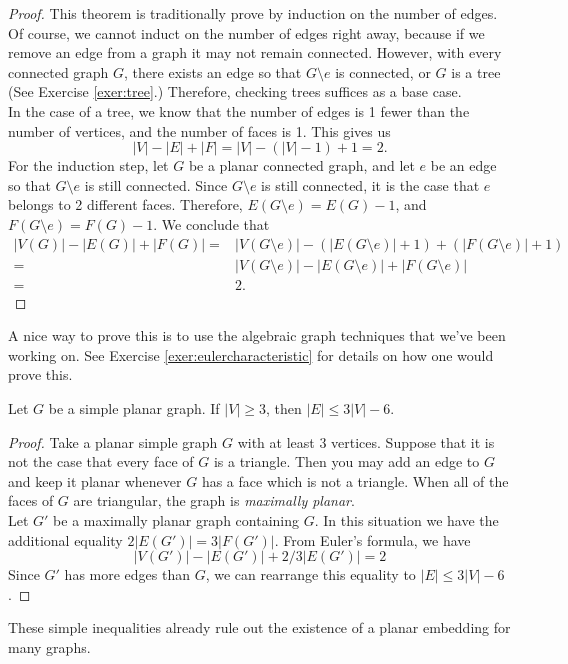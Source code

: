 \begin{proof}
 This theorem is traditionally prove by induction on the number of edges. Of course, we cannot induct on the number of edges right away, because if we remove an edge from a graph it may not remain connected. However, with every connected graph $G$, there exists an edge so that $G\setminus e$ is connected, or $G$ is a tree (See Exercise \ref{exer:tree}.) Therefore, checking trees suffices as a base case.\\
 In the case of a tree, we know that the number of edges is 1 fewer than the number of vertices, and the number of faces is 1. This gives us 
 \[|V|-|E|+|F|=|V|-(|V|-1)+1=2.\]
 For the induction step, let $G$ be a planar connected graph, and let $e$ be an edge so that $G\setminus e$ is still connected. Since $G\setminus e$ is still connected, it is the case that $e$ belongs to 2 different faces. Therefore, $E(G\setminus e)=E(G)-1$, and $F(G\setminus e)=F(G)-1$. We conclude that 
 \begin{align*}
 |V(G)|-|E(G)|+|F(G)|= &|V(G\setminus e)|-(|E(G\setminus e)|+1)+(|F(G\setminus e)|+1)\\
 =&|V(G\setminus e)|-|E(G\setminus e)|+|F(G\setminus e)|\\
 =&2.
 \end{align*}
\end{proof}
A nice way to prove this is to use the algebraic graph techniques that we've been working on. See Exercise \ref{exer:eulercharacteristic} for details on how one would prove this. 
\begin{corollary}
Let $G$ be a simple planar graph. If $|V|\geq 3$, then $|E|\leq 3|V|-6$. 
\end{corollary}
\begin{proof}
 Take a planar simple graph $G$ with at least 3 vertices. Suppose that it is not the case that every face of $G$ is a triangle. Then you may add an edge to $G$ and keep it planar whenever $G$ has a face which is not a triangle. When all of the faces of $G$ are triangular, the graph is \emph{maximally planar}.\\ 
 Let $G'$ be a maximally planar graph containing $G$. In this situation we have the additional equality $2|E(G')|=3|F(G')|$. From Euler's formula, we have 
 \[|V(G')|-|E(G')|+2/3 |E(G')|=2\]
Since $G'$ has more edges than $G$, we can rearrange this equality to $|E|\leq 3|V|-6$. 
\end{proof}
These simple inequalities already rule out the existence of a planar embedding for many graphs. 

